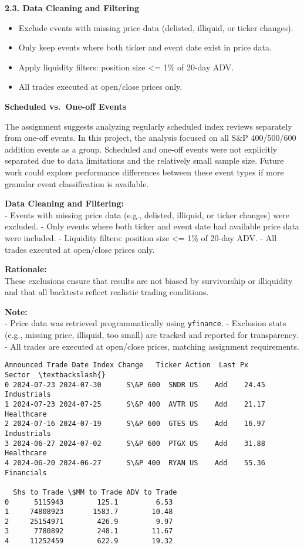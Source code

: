 \documentclass[11pt]{article}
\providecommand{\tightlist}{%
      \setlength{\itemsep}{0pt}\setlength{\parskip}{0pt}}
\begin{document}
\textbf{2.3. Data Cleaning and Filtering}

\begin{itemize}
\tightlist
\item
  Exclude events with missing price data (delisted, illiquid, or ticker
  changes).
\item
  Only keep events where both ticker and event date exist in price data.
\item
  Apply liquidity filters: position size \textless= 1\% of 20-day ADV.
\item
  All trades executed at open/close prices only.
\end{itemize}

\textbf{Scheduled vs.~One-off Events}

The assignment suggests analyzing regularly scheduled index reviews
separately from one-off events. In this project, the analysis focused on
all S\&P 400/500/600 addition events as a group. Scheduled and one-off
events were not explicitly separated due to data limitations and the
relatively small sample size. Future work could explore performance
differences between these event types if more granular event
classification is available.

\textbf{Data Cleaning and Filtering:}\\
- Events with missing price data (e.g., delisted, illiquid, or ticker
changes) were excluded. - Only events where both ticker and event date
had available price data were included. - Liquidity filters: position
size \textless= 1\% of 20-day ADV. - All trades executed at open/close
prices only.

\textbf{Rationale:}\\
These exclusions ensure that results are not biased by survivorship or
illiquidity and that all backtests reflect realistic trading conditions.

\textbf{Note:}\\
- Price data was retrieved programmatically using \texttt{yfinance}. -
Exclusion stats (e.g., missing price, illiquid, too small) are tracked
and reported for transparency. - All trades are executed at open/close
prices, matching assignment requirements.

    
    \begin{Verbatim}[commandchars=\\\{\}]
   Announced Trade Date Index Change   Ticker Action  Last Px       Sector  \textbackslash{}
0 2024-07-23 2024-07-30      S\&P 600  SNDR US    Add    24.45  Industrials   
1 2024-07-23 2024-07-25      S\&P 400  AVTR US    Add    21.17   Healthcare   
2 2024-07-16 2024-07-19      S\&P 600  GTES US    Add    16.97  Industrials   
3 2024-06-27 2024-07-02      S\&P 600  PTGX US    Add    31.88   Healthcare   
4 2024-06-20 2024-06-27      S\&P 400  RYAN US    Add    55.36   Financials   

  Shs to Trade \$MM to Trade ADV to Trade  
0      5115943        125.1         6.53  
1     74808923       1583.7        10.48  
2     25154971        426.9         9.97  
3      7780892        248.1        11.67  
4     11252459        622.9        19.32  
    \end{Verbatim}
\end{document}
